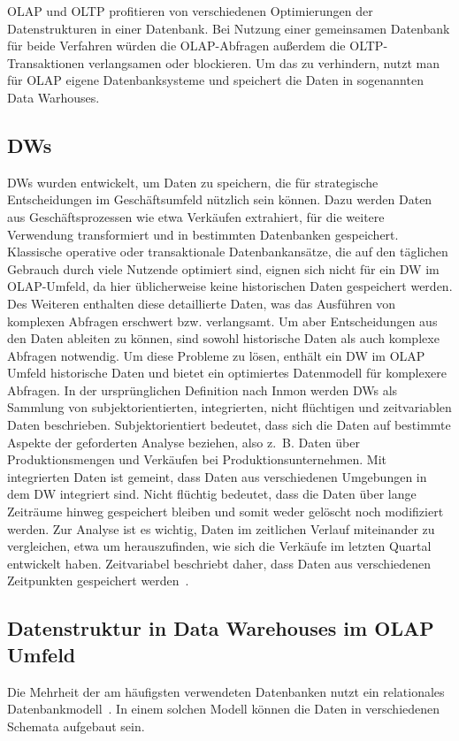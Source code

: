 \ac{OLAP} und \ac{OLTP} profitieren von verschiedenen Optimierungen der Datenstrukturen in einer Datenbank.
Bei Nutzung einer gemeinsamen Datenbank für beide Verfahren würden die \ac{OLAP}-Abfragen außerdem die \ac{OLTP}-Transaktionen verlangsamen oder blockieren.
Um das zu verhindern, nutzt man für \ac{OLAP} eigene Datenbanksysteme und speichert die Daten in sogenannten Data Warhouses.

\subsection{\acfp{DW}}
\acp{DW} wurden entwickelt, um Daten zu speichern, die für strategische Entscheidungen im Geschäftsumfeld nützlich sein können.
Dazu werden Daten aus Geschäftsprozessen wie etwa Verkäufen extrahiert, für die weitere Verwendung transformiert und in bestimmten Datenbanken gespeichert.
Klassische  operative oder transaktionale Datenbankansätze, die auf den täglichen Gebrauch durch viele Nutzende optimiert sind, eignen sich nicht für ein \ac{DW} im \ac{OLAP}-Umfeld, da hier üblicherweise keine historischen Daten gespeichert werden.
Des Weiteren enthalten diese detaillierte Daten, was das Ausführen von komplexen Abfragen erschwert bzw. verlangsamt.
Um aber Entscheidungen aus den Daten ableiten zu können, sind sowohl historische Daten als auch komplexe Abfragen notwendig.
Um diese Probleme zu lösen, enthält ein \ac{DW} im \ac{OLAP} Umfeld historische Daten und bietet ein optimiertes Datenmodell für komplexere Abfragen.
In der ursprünglichen Definition nach Inmon werden \acp{DW} als Sammlung von subjektorientierten, integrierten, nicht flüchtigen und zeitvariablen Daten beschrieben. %
Subjektorientiert bedeutet, dass sich die Daten auf bestimmte Aspekte der geforderten Analyse beziehen, also z.~B. Daten über Produktionsmengen und Verkäufen bei Produktionsunternehmen.
Mit integrierten Daten ist gemeint, dass Daten aus verschiedenen Umgebungen in dem \ac{DW} integriert sind.
Nicht flüchtig bedeutet, dass die Daten über lange Zeiträume hinweg gespeichert bleiben und somit weder gelöscht noch modifiziert werden.
Zur Analyse ist es wichtig, Daten im zeitlichen Verlauf miteinander zu vergleichen, etwa um herauszufinden, wie sich die Verkäufe im letzten Quartal entwickelt haben.
Zeitvariabel beschriebt daher, dass Daten aus verschiedenen Zeitpunkten gespeichert werden~\cite[S.~3f]{vaisman_data_2022}.

\subsection{Datenstruktur in Data Warehouses im \ac{OLAP} Umfeld}
Die Mehrheit der am häufigsten verwendeten Datenbanken nutzt ein relationales Datenbankmodell~\cite{db-engines_most_2023}. 
In einem solchen Modell können die Daten in verschiedenen Schemata aufgebaut sein.

